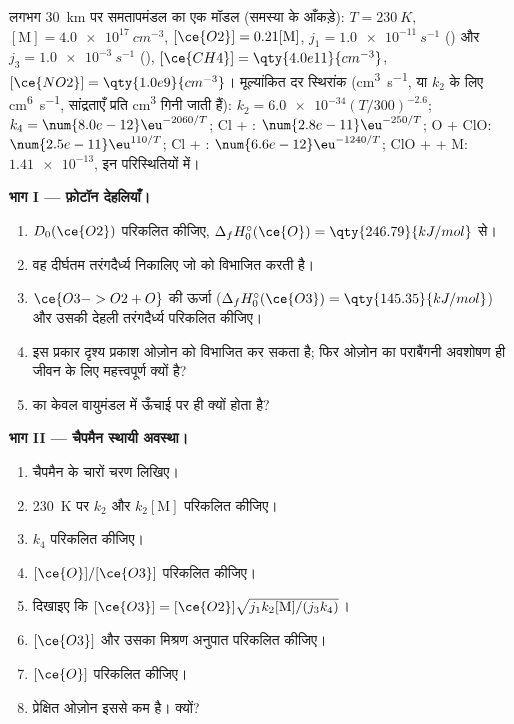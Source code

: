 \begin{problem}
\label{pb:b3:photochemistry:1}
लगभग \qty{30}{km} पर समतापमंडल का एक मॉडल (समस्या के आँकड़े): $T = \qty{230}{K}$, $[\mathrm M] =
\qty{4.0e17}{cm^{-3}}$, $[\ce{O2}] = 0.21[\mathrm M]$,  $j_1 = \qty{1.0e-11}{s^{-1}}$ ()
और $j_3 = \qty{1.0e-3}{s^{-1}}$ (), $[\ce{CH4}] = \qty{4.0e11}{cm^{-3}}$, $[\ce{NO2}] = \qty{1.0e9}{cm^{-3}}$। मूल्यांकित दर
स्थिरांक (\unit{cm^3.s^{-1}}, या $k_2$ के लिए \unit{cm^6.s^{-1}}, सांद्रताएँ प्रति \unit{cm^3} गिनी जाती हैं):
$k_2 = \num{6.0e-34}(T/300)^{-2.6}$; $k_4 = \num{8.0e-12}\eu^{-2060/T}$; Cl + : $\num{2.8e-11}\eu^{-250/T}$;
O + ClO: $\num{2.5e-11}\eu^{110/T}$; Cl + : $\num{6.6e-12}\eu^{-1240/T}$; ClO +  + M: $\num{1.41e-13}$,
इन परिस्थितियों में।

\medskip\noindent\textbf{भाग I --- फ़ोटॉन देहलियाँ।}
\begin{enumerate}
  \item $D_0(\ce{O2})$ परिकलित कीजिए, $\Delta_fH^\circ_0(\ce{O}) = \qty{246.79}{kJ/mol}$ से।
  \item वह दीर्घतम तरंगदैर्ध्य निकालिए जो  को विभाजित करती है।
  \item $\ce{O3 -> O2 + O}$ की ऊर्जा ($\Delta_fH^\circ_0(\ce{O3}) = \qty{145.35}{kJ/mol}$) और उसकी
        देहली तरंगदैर्ध्य परिकलित कीजिए।
  \item इस प्रकार दृश्य प्रकाश ओज़ोन को विभाजित कर सकता है; फिर ओज़ोन का पराबैंगनी अवशोषण
        ही जीवन के लिए महत्त्वपूर्ण क्यों है?
  \item {} का  केवल वायुमंडल में ऊँचाई पर ही क्यों होता है?
\end{enumerate}

\medskip\noindent\textbf{भाग II --- चैपमैन स्थायी अवस्था।}
\begin{enumerate}[resume]
  \item चैपमैन के चारों चरण लिखिए।
  \item \qty{230}{K} पर $k_2$ और $k_2[\mathrm M]$ परिकलित कीजिए।
  \item $k_4$ परिकलित कीजिए।
  \item $[\ce{O}]/[\ce{O3}]$ परिकलित कीजिए।
  \item दिखाइए कि $[\ce{O3}] = [\ce{O2}]\sqrt{j_1k_2[\mathrm M]/(j_3k_4)}$।
  \item $[\ce{O3}]$ और उसका मिश्रण अनुपात परिकलित कीजिए।
  \item $[\ce{O}]$ परिकलित कीजिए।
  \item प्रेक्षित ओज़ोन इससे कम है। क्यों?
\end{enumerate}


\end{problem}
